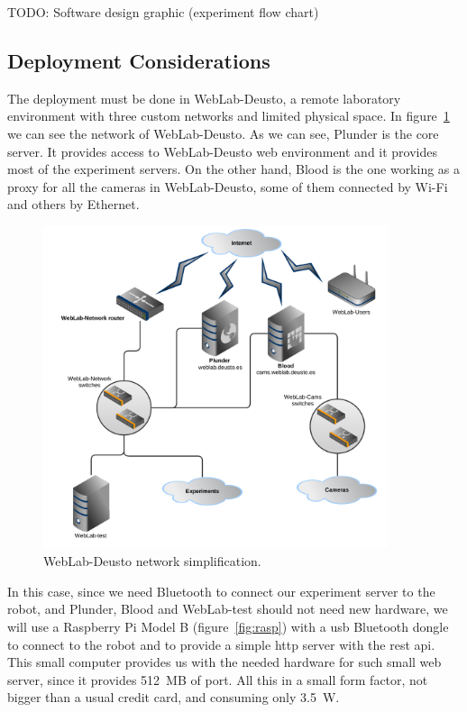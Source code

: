 TODO: Software design graphic (experiment flow chart)

\subsection{Deployment Considerations}

The deployment must be done in WebLab-Deusto, a remote laboratory environment with three custom
networks and limited physical space. In figure~\ref{fig:weblab-network} we can see the network of
WebLab-Deusto. As we can see, Plunder is the core server. It provides access to WebLab-Deusto web
environment and it provides most of the experiment servers. On the other hand, Blood is the one
working as a proxy for all the cameras in WebLab-Deusto, some of them connected by Wi-Fi and others
by Ethernet.

\begin{figure}[!htbp]
	\centering
	\includegraphics[width=0.9\textwidth]{fig/weblab-network}
	\caption{WebLab-Deusto network simplification.}\label{fig:weblab-network}
\end{figure}

In this case, since we need Bluetooth to connect our experiment server to the robot, and Plunder,
Blood and WebLab-test should not need new hardware, we will use a Raspberry Pi Model B
(figure~\ref{fig:rasp}) with a \acrshort{usb} Bluetooth dongle to connect to the robot and to
provide a simple \acrshort{http} server with the \acrshort{rest} \acrshort{api}. This small computer
provides us with the needed hardware for such small web server, since it provides 512~MB of
port. All this in a small form factor, not bigger than a usual credit card, and consuming only
3.5~W.

